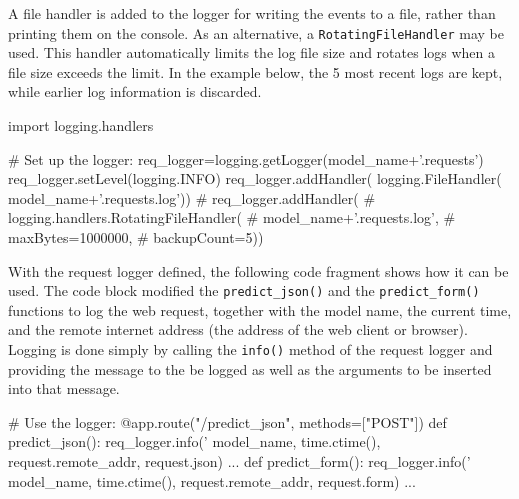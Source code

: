 A file handler is added to the logger for writing the events to a file, rather than printing them on the console. As an alternative, a \texttt{RotatingFileHandler} may be used. This handler automatically limits the log file size and rotates logs when a file size exceeds the limit. In the example below, the 5 most recent logs are kept, while earlier log information is discarded. 

\begin{samepage}
\begin{pythoncode}
import logging.handlers

# Set up the logger:
req_logger=logging.getLogger(model_name+'.requests')
req_logger.setLevel(logging.INFO)
req_logger.addHandler(
    logging.FileHandler(
        model_name+'.requests.log'))
# req_logger.addHandler(
#     logging.handlers.RotatingFileHandler(
#         model_name+'.requests.log',
#         maxBytes=1000000,
#         backupCount=5))
\end{pythoncode}
\end{samepage}

With the request logger defined, the following code fragment shows how it can be used. The code block modified the \texttt{predict\_json()} and the \texttt{predict\_form()} functions to log the web request, together with the model name, the current time, and the remote internet address (the address of the web client or browser). Logging is done simply by calling the \texttt{info()} method of the request logger and providing the message to the be logged as well as the arguments to be inserted into that message. 

\begin{samepage}
\begin{pythoncode}
# Use the logger:
@app.route("/predict_json", methods=["POST"])
def predict_json():
    req_logger.info('%
                    model_name, 
                    time.ctime(), 
                    request.remote_addr, 
                    request.json)
...
def predict_form():
    req_logger.info('%
                    model_name,
                    time.ctime(),
                    request.remote_addr,
                    request.form)
...
\end{pythoncode}
\end{samepage}

